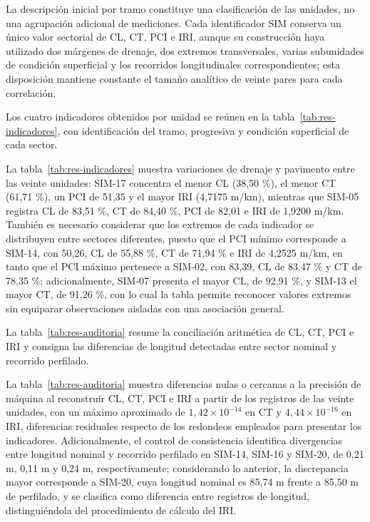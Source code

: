 
La descripción inicial por tramo constituye una clasificación de las unidades, no una agrupación adicional de mediciones. Cada identificador SIM conserva un único valor sectorial de CL, CT, PCI e IRI, aunque su construcción haya utilizado dos márgenes de drenaje, dos extremos transversales, varias subunidades de condición superficial y los recorridos longitudinales correspondientes; esta disposición mantiene constante el tamaño analítico de veinte pares para cada correlación.

Los cuatro indicadores obtenidos por unidad se reúnen en la tabla~\ref{tab:res-indicadores}, con identificación del tramo, progresiva y condición superficial de cada sector.

\tablaResultadoTres

La tabla~\ref{tab:res-indicadores} muestra variaciones de drenaje y pavimento entre las veinte unidades: SIM-17 concentra el menor CL (38,50 \%), el menor CT (61,71 \%), un PCI de 51,35 y el mayor IRI (4,7175 m/km), mientras que SIM-05 registra CL de 83,51 \%, CT de 84,40 \%, PCI de 82,01 e IRI de 1,9200 m/km. También es necesario considerar que los extremos de cada indicador se distribuyen entre sectores diferentes, puesto que el PCI mínimo corresponde a SIM-14, con 50,26, CL de 55,88 \%, CT de 71,94 \% e IRI de 4,2525 m/km, en tanto que el PCI máximo pertenece a SIM-02, con 83,39, CL de 83,47 \% y CT de 78,35 \%; adicionalmente, SIM-07 presenta el mayor CL, de 92,91 \%, y SIM-13 el mayor CT, de 91,26 \%, con lo cual la tabla permite reconocer valores extremos sin equiparar observaciones aisladas con una asociación general.


La tabla~\ref{tab:res-auditoria} resume la conciliación aritmética de CL, CT, PCI e IRI y consigna las diferencias de longitud detectadas entre sector nominal y recorrido perfilado.

\tablaResultadoCuatro

La tabla~\ref{tab:res-auditoria} muestra diferencias nulas o cercanas a la precisión de máquina al reconstruir CL, CT, PCI e IRI a partir de los registros de las veinte unidades, con un máximo aproximado de \(1{,}42\times 10^{-14}\) en CT y \(4{,}44\times 10^{-16}\) en IRI, diferencias residuales respecto de los redondeos empleados para presentar los indicadores. Adicionalmente, el control de consistencia identifica divergencias entre longitud nominal y recorrido perfilado en SIM-14, SIM-16 y SIM-20, de 0,21 m, 0,11 m y 0,24 m, respectivamente; considerando lo anterior, la discrepancia mayor corresponde a SIM-20, cuya longitud nominal es 85,74 m frente a 85,50 m de perfilado, y se clasifica como diferencia entre registros de longitud, distinguiéndola del procedimiento de cálculo del IRI.

